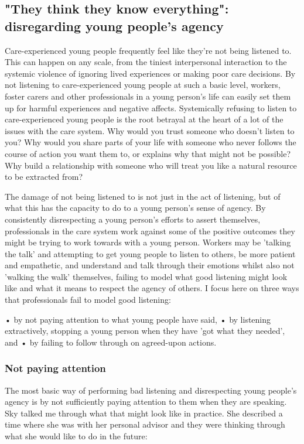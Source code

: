 \subsection{"They think they know everything": disregarding young people's agency}
Care-experienced young people frequently feel like they're not being listened to. This can happen on any scale, from the tiniest interpersonal interaction to the systemic violence of ignoring lived experiences or making poor care decisions. By not listening to care-experienced young people at such a basic level, workers, foster carers and other professionals in a young person's life can easily set them up for harmful experiences and negative affects. Systemically refusing to listen to care-experienced young people is the root betrayal at the heart of a lot of the issues with the care system. Why would you trust someone who doesn't listen to you? Why would you share parts of your life with someone who never follows the course of action you want them to, or explains why that might not be possible? Why build a relationship with someone who will treat you like a natural resource to be extracted from?

The damage of not being listened to is not just in the act of listening, but of what this has the capacity to do to a young person's sense of agency. By consistently disrespecting a young person's efforts to assert themselves, professionals in the care system work against some of the positive outcomes they might be trying to work towards with a young person. Workers may be 'talking the talk' and attempting to get young people to listen to others, be more patient and empathetic, and understand and talk through their emotions whilst also not 'walking the walk' themselves, failing to model what good listening might look like and what it means to respect the agency of others. I focus here on three ways that professionals fail to model good listening:

•	by not paying attention to what young people have said,
•	by listening extractively, stopping a young person when they have 'got what they needed', and
•	by failing to follow through on agreed-upon actions.

\subsubsection{Not paying attention}
The most basic way of performing bad listening and disrespecting young people's agency is by not sufficiently paying attention to them when they are speaking. Sky talked me through what that might look like in practice. She described a time where she was with her personal advisor and they were thinking through what she would like to do in the future:

